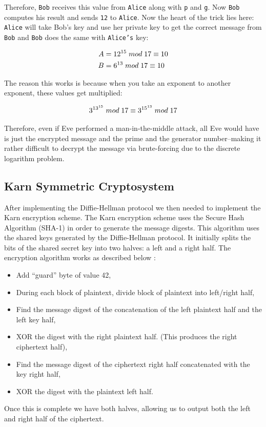 \documentclass[10pt]{article}
\begin{document}
Therefore, \texttt{Bob} receives this value from \texttt{Alice} along with
\texttt{p} and \texttt{g}. Now \texttt{Bob} computes his result and sends
\texttt{12} to \texttt{Alice}. Now the heart of the trick lies here:
\texttt{Alice} will take Bob's key and use her private key to get the correct
message from \texttt{Bob} and \texttt{Bob} does the same with \texttt{Alice's}
key:

\begin{align*}
    A &= 12^{15} \thickspace mod \thickspace 17 \equiv 10 \\
    B &= 6^{13} \thickspace  mod \thickspace 17 \equiv 10
\end{align*}

The reason this works is because when you take an exponent to another exponent, these values get
multiplied:

\begin{align*}
    3^{13^{15}} \thickspace mod \thickspace 17 \equiv 3^{15^{13}} \thickspace mod \thickspace 17
\end{align*}

Therefore, even if Eve performed a man-in-the-middle attack, all Eve would have
is just the encrypted message and the prime and the generator number--making it
rather difficult to decrypt the message via brute-forcing due to the discrete
logarithm problem.

\subsection{Karn Symmetric Cryptosystem}
After implementing the Diffie-Hellman protocol we then needed to implement the
Karn encryption scheme. The Karn encryption scheme uses the Secure Hash
Algorithm (SHA-1) in order to generate the message digests. This algorithm uses
the shared keys generated by the Diffie-Hellman protocol. It initially splits
the bits of the shared secret key into two halves: a left and a right half. The
encryption algorithm works as described below \cite{karn}:
\begin{itemize}
    \item Add ``guard'' byte of value 42,
    \item During each block of plaintext, divide block of plaintext into
          left/right half,
    \item Find the message digest of the concatenation of the left plaintext
          half and the left key half,
    \item XOR the digest with the right plaintext half. (This produces the
          right ciphertext half),
    \item Find the message digest of the ciphertext right half concatenated
          with the key right half,
    \item XOR the digest with the plaintext left half.
\end{itemize}
Once this is complete we have both halves, allowing us to output both the left
and right half of the ciphertext.
\end{document}
